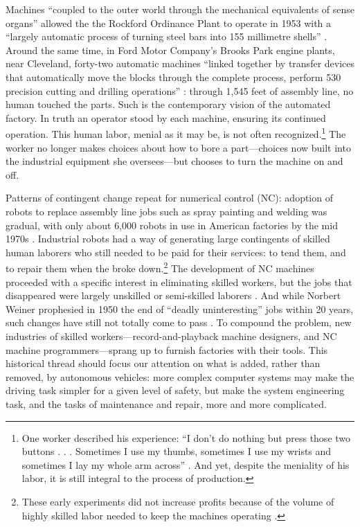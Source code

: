 Machines ``coupled to the
outer world through the mechanical equivalents of sense organs''
allowed the the Rockford
Ordinance Plant to operate in 1953 with a ``largely automatic process of
turning steel bars into 155 millimetre
shells'' \cite{wienerMachineThreat}. Around the same time, in Ford
Motor Company's Brooks Park engine plants, near Cleveland, forty-two
automatic machines ``linked together by transfer devices that
automatically move the blocks through the complete process, perform
530 precision cutting and drilling operations'' \cite[p.
  9]{dieboldImpact}: through 1,545 feet of assembly line, no human
touched the parts. Such is the contemporary vision of the automated factory. In
truth an operator stood by each machine, ensuring its continued
operation. This human labor, menial as it may be, is not often
recognized.\footnote{One worker described his experience: ``I don't do nothing but
press those two buttons . . . Sometimes I use my thumbs, sometimes I
use my wrists and sometimes I lay my whole arm across'' \cite[p.
  10]{dieboldImpact}. And yet,
despite the meniality of his labor, it is still integral to the
process of production.} The worker
no longer makes choices about how to bore a part---choices now built into the industrial equipment 
she oversees---but chooses to turn the machine on and off.%


Patterns of contingent change repeat for
numerical control (NC): adoption of robots to replace assembly line jobs such
as spray painting and welding was gradual, with only
about 6,000 robots in use in American factories by the mid
1970s \cite[p. 159]{nyeAmericas}. Industrial robots
had a way of generating large contingents of skilled human laborers
who still needed to be paid for their services:  to tend them, and
to repair them when the broke down.\footnote{These early experiments did not
increase profits because of the volume of highly skilled labor needed
to keep the machines operating \cite[p. 162]{nyeAmericas}.} The development of NC machines
proceeded with a specific interest in eliminating skilled workers, but
the jobs that disappeared were largely unskilled or semi-skilled
laborers \cite[p. 164]{nyeAmericas}. And while Norbert Weiner
prophesied in 1950 the end of ``deadly uninteresting'' jobs within 20
years, such changes have still not 
totally come to pass \cite[p. 161]{nyeAmericas}. To compound the problem, new industries of
skilled workers---record-and-playback machine designers, and NC machine
programmers---sprang up to furnish factories with their tools. This
historical thread should focus our attention on what is added, rather
than removed, by
autonomous vehicles: more complex computer systems may make the driving
task simpler for a given level of safety, but make the system
engineering task, and the tasks of maintenance and repair, more and more complicated.

